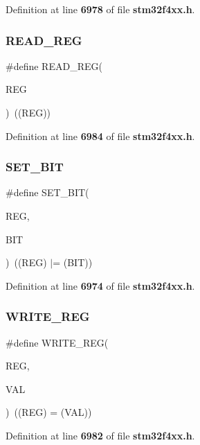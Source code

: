Definition at line \textbf{ 6978} of file \textbf{ stm32f4xx.\+h}.

\mbox{\label{group__Exported__macro_gae7f188a4d26c9e713a48414783421071}} 
\subsubsection{R\+E\+A\+D\+\_\+\+R\+EG}
{\footnotesize\ttfamily \#define R\+E\+A\+D\+\_\+\+R\+EG(\begin{DoxyParamCaption}\item[{}]{R\+EG }\end{DoxyParamCaption})~((R\+EG))}



Definition at line \textbf{ 6984} of file \textbf{ stm32f4xx.\+h}.

\mbox{\label{group__Exported__macro_ga26474f43799fbade9cf300e21dd3a91a}} 
\subsubsection{S\+E\+T\+\_\+\+B\+IT}
{\footnotesize\ttfamily \#define S\+E\+T\+\_\+\+B\+IT(\begin{DoxyParamCaption}\item[{}]{R\+EG,  }\item[{}]{B\+IT }\end{DoxyParamCaption})~((R\+EG) $\vert$= (B\+IT))}



Definition at line \textbf{ 6974} of file \textbf{ stm32f4xx.\+h}.

\mbox{\label{group__Exported__macro_ga32f78bffcaf6d13023dcd7f05e0c4d57}} 
\subsubsection{W\+R\+I\+T\+E\+\_\+\+R\+EG}
{\footnotesize\ttfamily \#define W\+R\+I\+T\+E\+\_\+\+R\+EG(\begin{DoxyParamCaption}\item[{}]{R\+EG,  }\item[{}]{V\+AL }\end{DoxyParamCaption})~((R\+EG) = (V\+AL))}



Definition at line \textbf{ 6982} of file \textbf{ stm32f4xx.\+h}.

